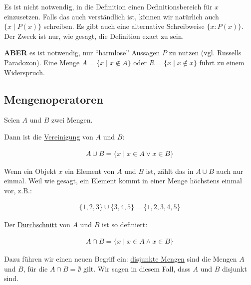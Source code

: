 \documentclass[12pt,a4paper,oneside]{article}
\newcommand{\afz}[1]{\enquote{#1}}
\newcommand{\emptyline}{\hspace*{\fill}}
\begin{document}
            \emptyline

            Es ist nicht notwendig, in die Definition einen Definitionsbereich für $x$ einzusetzen.
            Falls das auch verständlich ist, können wir natürlich auch $\{x \;|\; P(x)\}$ schreiben.
            Es gibt auch eine alternative Schreibweise $\{x : P(x)\}$.
            Der Zweck ist nur, wie gesagt, die Definition exact zu sein.

            \emptyline

            \textbf{ABER} es ist notwendig, nur \afz{harmlose} Aussagen $P$ zu nutzen (vgl. Russells Paradoxon).
            Eine Menge $A = \{x \;|\; x \notin A\}$ oder $R = \{x \;|\; x \notin x\}$ führt zu einem Widerspruch.

        \subsection{Mengenoperatoren}

            Seien $A$ und $B$ zwei Mengen.

            \emptyline

            Dann ist die \ul{Vereinigung} von $A$ und $B$:

            \vspace{-1em}
            \begin{align*}
                A \cup B = \{x \;|\; x \in A \vee x \in B\}
            \end{align*}

            \newpage

            Wenn ein Objekt $x$ ein Element von $A$ und $B$ ist, zählt das in $A \cup B$ auch nur einmal.
            Weil wie gesagt, ein Element kommt in einer Menge höchstens einmal vor, z.B.:

            \vspace{-1em}
            \begin{align*}
                \{1, 2, 3\} \cup \{3, 4, 5\} = \{1, 2, 3, 4, 5\}
            \end{align*}

            Der \ul{Durchschnitt} von $A$ und $B$ ist so definiert:

            \vspace{-1em}
            \begin{align*}
                A \cap B = \{x \;|\; x \in A \wedge x \in B\}
            \end{align*}

            Dazu führen wir einen neuen Begriff ein:
            \ul{disjunkte Mengen} sind die Mengen $A$ und $B$, für die $A \cap B = \emptyset$ gilt.
            Wir sagen in diesem Fall, dass $A$ und $B$ disjunkt sind.
\end{document}

